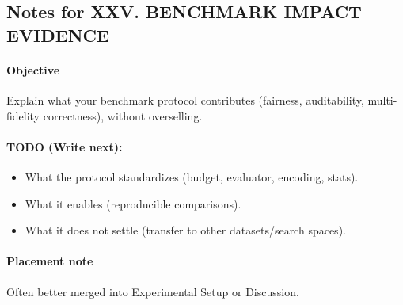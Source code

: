 \subsection*{Notes for XXV. BENCHMARK IMPACT EVIDENCE}
\paragraph{Objective}
Explain what your benchmark protocol contributes (fairness, auditability, multi-fidelity correctness), without overselling.

\paragraph{TODO (Write next):}
\begin{itemize}
  \item What the protocol standardizes (budget, evaluator, encoding, stats).
  \item What it enables (reproducible comparisons).
  \item What it does not settle (transfer to other datasets/search spaces).
\end{itemize}

\paragraph{Placement note}
Often better merged into Experimental Setup or Discussion.
